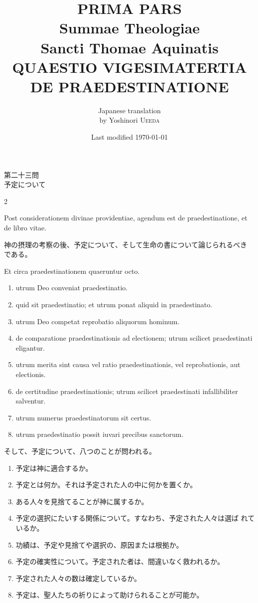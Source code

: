 \documentclass[paper=a4paper,fontsize=10pt,jafontsize=9pt,titlepage]{jlreq}
\title{{\bfseries PRIMA PARS}\\{\Huge Summae Theologiae}\\Sancti Thomae
Aquinatis\\{\sffamily QUAESTIO VIGESIMATERTIA}\\DE PRAEDESTINATIONE}
\author{Japanese translation\\by Yoshinori {\scshape Ueeda}}
\date{Last modified \today}
\begin{document}
\maketitle
\pagestyle{fancy}


\begin{center}
{\Large 第二十三問\\予定について}
\end{center}


\begin{paracol}{2}

Post considerationem divinae providentiae, agendum est de
 praedestinatione, et de libro vitae.


\switchcolumn


神の摂理の考察の後、予定について、そして生命の書について論じられるべき
 である。


\switchcolumn*


Et circa praedestinationem
 quaeruntur octo.
\begin{enumerate}
 \item utrum Deo conveniat praedestinatio.
 \item quid sit praedestinatio; et utrum ponat aliquid in praedestinato.
 \item utrum Deo competat reprobatio aliquorum hominum.
 \item de comparatione praedestinationis ad electionem; utrum scilicet
       praedestinati eligantur.
 \item utrum merita sint causa vel ratio praedestinationis, vel
       reprobationis, aut electionis.
 \item de certitudine praedestinationis; utrum scilicet praedestinati
       infallibiliter salventur.
 \item utrum numerus praedestinatorum sit certus.
 \item utrum praedestinatio possit iuvari precibus sanctorum.
\end{enumerate}


\switchcolumn


そして、予定について、八つのことが問われる。

\begin{enumerate}
 \item 予定は神に適合するか。
 \item 予定とは何か。それは予定された人の中に何かを置くか。
 \item ある人々を見捨てることが神に属するか。
 \item 予定の選択にたいする関係について。すなわち、予定された人々は選ば
       れているか。
 \item 功績は、予定や見捨てや選択の、原因または根拠か。
 \item 予定の確実性について。予定された者は、間違いなく救われるか。
 \item 予定された人々の数は確定しているか。
 \item 予定は、聖人たちの祈りによって助けられることが可能か。
\end{enumerate}


\switchcolumn*



\end{paracol}
\end{document}
